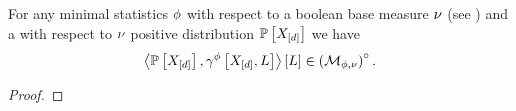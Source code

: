 \begin{theorem}
    \label{the:meanPolytopeInteriorCharacterization}
    For any minimal statistics $\phi$ with respect to a boolean base measure $\nu$ (see ) and a with respect to $\nu$ positive distribution $\mathbb{P}\left[X_{[d]}\right]$ we have
    \begin{align*}
         \left\langle \mathbb{P}\left[X_{[d]}\right],\gamma^{\phi}\left[X_{[d]},L\right]\right\rangle \left[ L \right] \in {\left(\mathcal{M}_{\phi,\nu}\right)}^{\circ} \, .
    \end{align*}
\end{theorem}
\begin{proof}


\end{proof}
